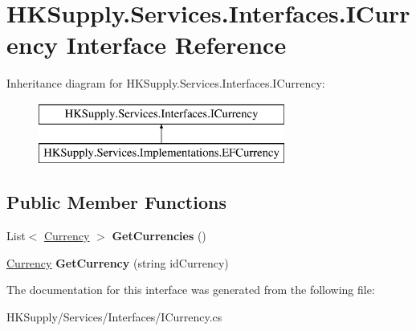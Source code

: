 \hypertarget{interface_h_k_supply_1_1_services_1_1_interfaces_1_1_i_currency}{}\section{H\+K\+Supply.\+Services.\+Interfaces.\+I\+Currency Interface Reference}
\label{interface_h_k_supply_1_1_services_1_1_interfaces_1_1_i_currency}
Inheritance diagram for H\+K\+Supply.\+Services.\+Interfaces.\+I\+Currency\+:\begin{figure}[H]
\begin{center}
\leavevmode
\includegraphics[height=2.000000cm]{interface_h_k_supply_1_1_services_1_1_interfaces_1_1_i_currency}
\end{center}
\end{figure}
\subsection*{Public Member Functions}
\begin{DoxyCompactItemize}
\item 
\mbox{\label{interface_h_k_supply_1_1_services_1_1_interfaces_1_1_i_currency_a37f43c962bdc73bea846c56025261cda}} 
List$<$ \mbox{\hyperlink{class_h_k_supply_1_1_models_1_1_currency}{Currency}} $>$ {\bfseries Get\+Currencies} ()
\item 
\mbox{\label{interface_h_k_supply_1_1_services_1_1_interfaces_1_1_i_currency_a7f6b03b3591e08e38432f45b9293a24a}} 
\mbox{\hyperlink{class_h_k_supply_1_1_models_1_1_currency}{Currency}} {\bfseries Get\+Currency} (string id\+Currency)
\end{DoxyCompactItemize}


The documentation for this interface was generated from the following file\+:\begin{DoxyCompactItemize}
\item 
H\+K\+Supply/\+Services/\+Interfaces/I\+Currency.\+cs\end{DoxyCompactItemize}
